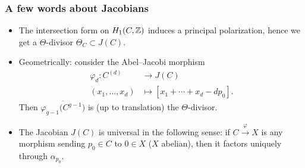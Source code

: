 \begin{frame}
\frametitle{A few words about Jacobians}

\begin{itemize}
	\item The intersection form on $H_1(C,\mathbb{Z})$ induces a principal polarization, hence we get a \alert{$\Theta$-divisor} $\Theta_C \subset J(C)$.
	\pause
	\item Geometrically: consider the \alert{Abel--Jacobi} morphism
	\begin{align*}
	\varphi_d\colon C^{(d)} &\to J(C) \\
	(x_1,\ldots,x_d) &\mapsto [x_1+\cdots+ x_d-dp_0].
	\end{align*}
	Then $\overline{\varphi_{g-1}\big(C^{g-1}\big)}$ is (up to translation) the $\Theta$-divisor. \pause
	\item The Jacobian $J(C)$ is \alert{universal} in the following sense: if $C \xrightarrow{\varphi} X$ is any morphism sending $p_0 \in C$ to $0 \in X$ ($X$ abelian), then it factors uniquely through $\alpha_{p_0}$.
\end{itemize}
\end{frame}